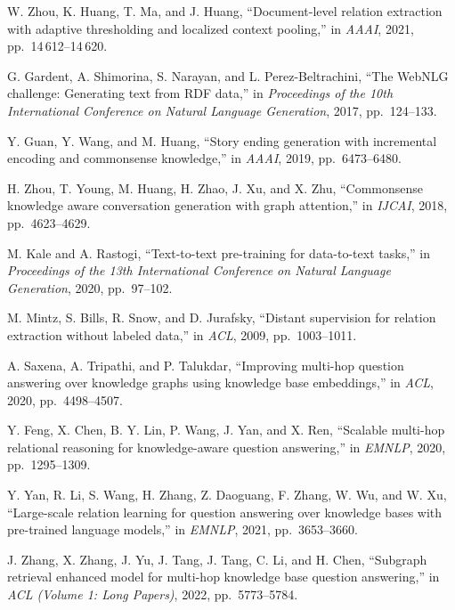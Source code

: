 \begin{enumerate}[leftmargin=2em,label={[\arabic*]}]
\item W. Zhou, K. Huang, T. Ma, and J. Huang, ``Document-level relation extraction with adaptive thresholding and localized context pooling,'' in \textit{AAAI}, 2021, pp.~14\,612--14\,620.

\item G. Gardent, A. Shimorina, S. Narayan, and L. Perez-Beltrachini, ``The WebNLG challenge: Generating text from RDF data,'' in \textit{Proceedings of the 10th International Conference on Natural Language Generation}, 2017, pp.~124--133.

\item Y. Guan, Y. Wang, and M. Huang, ``Story ending generation with incremental encoding and commonsense knowledge,'' in \textit{AAAI}, 2019, pp.~6473--6480.

\item H. Zhou, T. Young, M. Huang, H. Zhao, J. Xu, and X. Zhu, ``Commonsense knowledge aware conversation generation with graph attention,'' in \textit{IJCAI}, 2018, pp.~4623--4629.

\item M. Kale and A. Rastogi, ``Text-to-text pre-training for data-to-text tasks,'' in \textit{Proceedings of the 13th International Conference on Natural Language Generation}, 2020, pp.~97--102.

\item M. Mintz, S. Bills, R. Snow, and D. Jurafsky, ``Distant supervision for relation extraction without labeled data,'' in \textit{ACL}, 2009, pp.~1003--1011.

\item A. Saxena, A. Tripathi, and P. Talukdar, ``Improving multi-hop question answering over knowledge graphs using knowledge base embeddings,'' in \textit{ACL}, 2020, pp.~4498--4507.

\item Y. Feng, X. Chen, B. Y. Lin, P. Wang, J. Yan, and X. Ren, ``Scalable multi-hop relational reasoning for knowledge-aware question answering,'' in \textit{EMNLP}, 2020, pp.~1295--1309.

\item Y. Yan, R. Li, S. Wang, H. Zhang, Z. Daoguang, F. Zhang, W. Wu, and W. Xu, ``Large-scale relation learning for question answering over knowledge bases with pre-trained language models,'' in \textit{EMNLP}, 2021, pp.~3653--3660.

\item J. Zhang, X. Zhang, J. Yu, J. Tang, J. Tang, C. Li, and H. Chen, ``Subgraph retrieval enhanced model for multi-hop knowledge base question answering,'' in \textit{ACL (Volume 1: Long Papers)}, 2022, pp.~5773--5784.


\end{enumerate}
